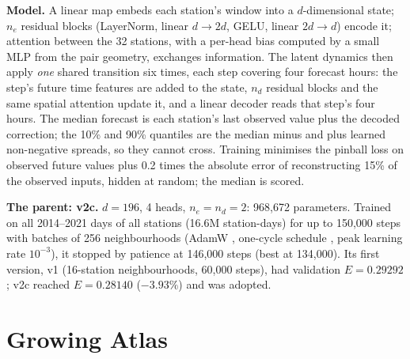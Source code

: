 \documentclass{article}
\begin{document}
\textbf{Model.} A linear map embeds each station's window into a $d$-dimensional state; $n_e$ residual blocks
(LayerNorm, linear $d\to2d$, GELU, linear $2d\to d$) encode it; attention between the 32 stations, with a per-head bias
computed by a small MLP from the pair geometry, exchanges information. The latent dynamics then apply \emph{one} shared
transition six times, each step covering four forecast hours: the step's future time features are added to the state,
$n_d$ residual blocks and the same spatial attention update it, and a linear decoder reads that step's four hours. The
median forecast is each station's last observed value plus the decoded correction; the 10\% and 90\% quantiles are
the median minus and plus learned non-negative spreads, so they cannot cross. Training minimises the pinball loss
\citep{koenker1978quantile} on observed future values plus 0.2 times the absolute error of reconstructing 15\% of the
observed inputs, hidden at random; the median is scored.

\textbf{The parent: v2c.} $d=196$, 4 heads, $n_e=n_d=2$: 968,672 parameters. Trained on all 2014--2021 days of all
stations (16.6M station-days) for up to 150,000 steps with batches of 256 neighbourhoods (AdamW
\citep{loshchilov2019adamw}, one-cycle schedule \citep{smith2019onecycle}, peak learning rate $10^{-3}$), it stopped by
patience at 146,000 steps (best at 134,000). Its first version, v1 (16-station neighbourhoods, 60,000 steps), had
validation $E=0.29292$; v2c reached $E=0.28140$ ($-3.93\%$) and was adopted.

\section{Growing Atlas}
\label{sec:grow}
\end{document}
